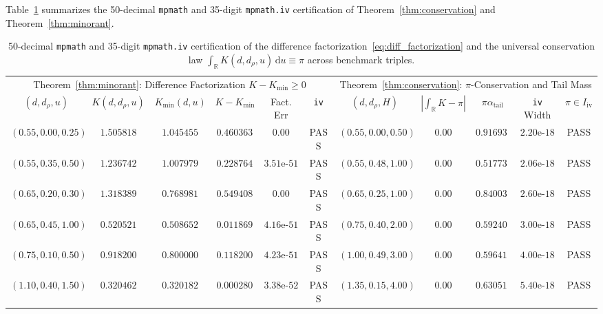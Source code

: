 \documentclass[11pt,reqno]{amsart}
\theoremstyle{definition}
\theoremstyle{remark}
\numberwithin{equation}{section}
\newcommand{\R}{\mathbb{R}}
\newcommand{\dd}{\mathrm{d}}
\begin{document}
Table~\ref{tab:conservation_minorant} summarizes the 50-decimal \texttt{mpmath} and 35-digit \texttt{mpmath.iv} certification of Theorem~\ref{thm:conservation} and Theorem~\ref{thm:minorant}.

\begin{table}[t]
\centering
\caption{50-decimal \texttt{mpmath} and 35-digit \texttt{mpmath.iv} certification of the difference factorization~\eqref{eq:diff_factorization} and the universal conservation law $\int_{\R} K(d, d_\rho, u)\,\dd u \equiv \pi$ across benchmark triples.}\label{tab:conservation_minorant}
\scriptsize
\setlength{\tabcolsep}{1.8pt}
\begin{tabular}{@{}cccccc|ccccc@{}}
\toprule
\multicolumn{6}{c|}{Theorem~\ref{thm:minorant}: Difference Factorization $K - K_{\min} \ge 0$} & \multicolumn{5}{c}{Theorem~\ref{thm:conservation}: $\pi$-Conservation and Tail Mass} \\
\cmidrule(r){1-6}\cmidrule(l){7-11}
$(d, d_\rho, u)$ & $K(d, d_\rho, u)$ & $K_{\min}(d,u)$ & $K - K_{\min}$ & Fact. Err & \texttt{iv} & $(d, d_\rho, H)$ & $|\int_{\R} K - \pi|$ & $\pi\alpha_{\mathrm{tail}}$ & \texttt{iv} Width & $\pi \in I_{\mathrm{iv}}$ \\
\midrule
$(0.55, 0.00, 0.25)$ & $1.505818$ & $1.045455$ & $0.460363$ & $0.00$            & PASS & $(0.55, 0.00, 0.50)$ & $0.00$ & $0.916931$ & $2.20\text{e-}18$ & PASS \\
$(0.55, 0.35, 0.50)$ & $1.236742$ & $1.007979$ & $0.228764$ & $3.51\text{e-}51$ & PASS & $(0.55, 0.48, 1.00)$ & $0.00$ & $0.517739$ & $2.06\text{e-}18$ & PASS \\
$(0.65, 0.20, 0.30)$ & $1.318389$ & $0.768981$ & $0.549408$ & $0.00$            & PASS & $(0.65, 0.25, 1.00)$ & $0.00$ & $0.840035$ & $2.60\text{e-}18$ & PASS \\
$(0.65, 0.45, 1.00)$ & $0.520521$ & $0.508652$ & $0.011869$ & $4.16\text{e-}51$ & PASS & $(0.75, 0.40, 2.00)$ & $0.00$ & $0.592408$ & $3.00\text{e-}18$ & PASS \\
$(0.75, 0.10, 0.50)$ & $0.918200$ & $0.800000$ & $0.118200$ & $4.23\text{e-}51$ & PASS & $(1.00, 0.49, 3.00)$ & $0.00$ & $0.596410$ & $4.00\text{e-}18$ & PASS \\
$(1.10, 0.40, 1.50)$ & $0.320462$ & $0.320182$ & $0.000280$ & $3.38\text{e-}52$ & PASS & $(1.35, 0.15, 4.00)$ & $0.00$ & $0.630519$ & $5.40\text{e-}18$ & PASS \\
\bottomrule
\end{tabular}
\end{table}
\end{document}
